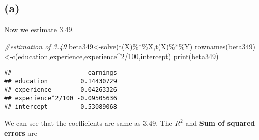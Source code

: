 \documentclass[
]{article}
\newenvironment{Shaded}{\begin{snugshade}}{\end{snugshade}}
\newcommand{\CommentTok}[1]{\textcolor[rgb]{0.56,0.35,0.01}{\textit{#1}}}
\newcommand{\DecValTok}[1]{\textcolor[rgb]{0.00,0.00,0.81}{#1}}
\newcommand{\FloatTok}[1]{\textcolor[rgb]{0.00,0.00,0.81}{#1}}
\newcommand{\FunctionTok}[1]{\textcolor[rgb]{0.00,0.00,0.00}{#1}}
\newcommand{\NormalTok}[1]{#1}
\newcommand{\OtherTok}[1]{\textcolor[rgb]{0.56,0.35,0.01}{#1}}
\newcommand{\SpecialCharTok}[1]{\textcolor[rgb]{0.00,0.00,0.00}{#1}}
\newcommand{\StringTok}[1]{\textcolor[rgb]{0.31,0.60,0.02}{#1}}
\begin{document}
\hypertarget{a}{%
\subsection{(a)}\label{a}}

Now we estimate 3.49.

\begin{Shaded}
\begin{Highlighting}[]
\CommentTok{\#estimation of 3.49}
\NormalTok{beta349}\OtherTok{\textless{}{-}}\FunctionTok{solve}\NormalTok{(}\FunctionTok{t}\NormalTok{(X)}\SpecialCharTok{\%*\%}\NormalTok{X,}\FunctionTok{t}\NormalTok{(X)}\SpecialCharTok{\%*\%}\NormalTok{Y)}
\FunctionTok{rownames}\NormalTok{(beta349)}\OtherTok{\textless{}{-}}\FunctionTok{c}\NormalTok{(}\StringTok{\textquotesingle{}education\textquotesingle{}}\NormalTok{,}\StringTok{\textquotesingle{}experience\textquotesingle{}}\NormalTok{,}\StringTok{\textquotesingle{}experience\^{}2/100\textquotesingle{}}\NormalTok{,}\StringTok{\textquotesingle{}intercept\textquotesingle{}}\NormalTok{)}
\FunctionTok{print}\NormalTok{(beta349)}
\end{Highlighting}
\end{Shaded}

\begin{verbatim}
##                     earnings
## education         0.14430729
## experience        0.04263326
## experience^2/100 -0.09505636
## intercept         0.53089068
\end{verbatim}

We can see that the coefficients are same as 3.49. The \(R^2\) and
\textbf{Sum of squared errors} are

\begin{Shaded}
\end{Shaded}
\end{document}
